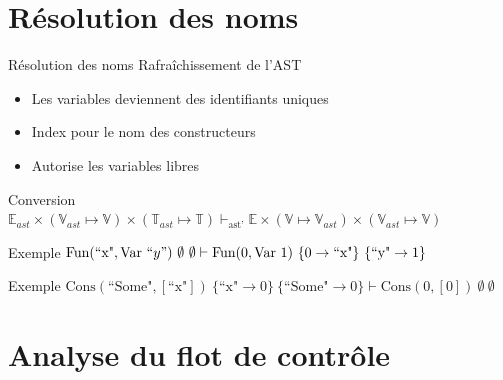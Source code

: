 \documentclass{beamer}
\begin{document}
\section{Résolution des noms}

\begin{frame}{Résolution des noms}
    Rafraîchissement de l'AST

    \begin{itemize}
        \item Les variables deviennent des identifiants uniques
        \item Index pour le nom des constructeurs
        \item Autorise les variables libres
    \end{itemize}

    \begin{block}{Conversion}
        $\mathbb{E}_{ast} \times \left( \mathbb{V}_{ast} \mapsto \mathbb{V} \right) \times \left( \mathbb{T}_{ast} \mapsto \mathbb{T} \right) \vdash_{\text{ast'}} \mathbb{E} \times \left( \mathbb{V} \mapsto \mathbb{V}_{ast} \right) \times \left( \mathbb{V}_{ast} \mapsto \mathbb{V} \right)$
    \end{block}

    \begin{exampleblock}{Exemple}
        $\text{Fun}(\text{``x"}, \text{Var} ~ ``y") ~ \emptyset ~ \emptyset \vdash \text{Fun}(0, \text{Var} ~ 1) ~ \lbrace 0 \rightarrow \text{``x"} \rbrace ~ \lbrace \text{``y"} \rightarrow 1 \rbrace$
    \end{exampleblock}

    \begin{exampleblock}{Exemple}
        $\text{Cons}(\text{``Some"}, [\text{``x"}]) ~ \lbrace \text{``x"} \rightarrow 0 \rbrace ~ \lbrace \text{``Some"} \rightarrow 0 \rbrace \vdash \text{Cons}(0, [0]) ~ \emptyset ~ \emptyset$
    \end{exampleblock}
\end{frame}

\section{Analyse du flot de contrôle}
\end{document}
